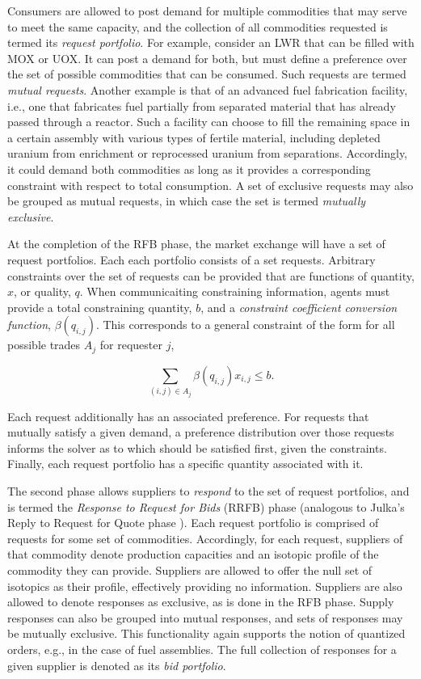 Consumers are allowed to post demand for multiple commodities that may serve to
meet the same capacity, and the collection of all commodities requested is
termed its \textit{request portfolio}. For example, consider an LWR that can be
filled with MOX or UOX. It can post a demand for both, but must define a
preference over the set of possible commodities that can be consumed. Such
requests are termed \textit{mutual requests}. Another example is that of an
advanced fuel fabrication facility, i.e., one that fabricates fuel partially
from separated material that has already passed through a reactor. Such a
facility can choose to fill the remaining space in a certain assembly with
various types of fertile material, including depleted uranium from enrichment or
reprocessed uranium from separations. Accordingly, it could demand both
commodities as long as it provides a corresponding constraint with respect to
total consumption. A set of exclusive requests may also be grouped as mutual
requests, in which case the set is termed \textit{mutually exclusive}.

At the completion of the RFB phase, the market exchange will have a set of
request portfolios. Each each portfolio consists of a set requests. Arbitrary
constraints over the set of requests can be provided that are functions of
quantity, $x$, or quality, $q$.  When communicaiting constraining information,
agents must provide a total constraining quantity, $b$, and a \textit{constraint
  coefficient conversion function}, $\beta (q_{i, j})$. This corresponds to a
general constraint of the form for all possible trades $A_j$ for requester $j$,

\begin{equation}\label{meth:constr}
  \sum_{(i, j) \in A_j} \beta (q_{i,j}) x_{i, j} \leq b.
\end{equation}

Each request additionally has an associated preference. For requests that
mutually satisfy a given demand, a preference distribution over those requests
informs the solver as to which should be satisfied first, given the
constraints. Finally, each request portfolio has a specific quantity associated
with it.

The second phase allows suppliers to \textit{respond} to the set of request
portfolios, and is termed the \textit{Response to Request for Bids} (RRFB) phase
(analogous to Julka's Reply to Request for Quote phase
\cite{julka_agent-based_2002}). Each request portfolio is comprised of requests
for some set of commodities. Accordingly, for each request, suppliers of that
commodity denote production capacities and an isotopic profile of the commodity
they can provide. Suppliers are allowed to offer the null set of isotopics as
their profile, effectively providing no information. Suppliers are also allowed
to denote responses as exclusive, as is done in the RFB phase. Supply responses
can also be grouped into mutual responses, and sets of responses may be mutually
exclusive. This functionality again supports the notion of quantized orders,
e.g., in the case of fuel assemblies. The full collection of responses for a
given supplier is denoted as its \textit{bid portfolio}.

